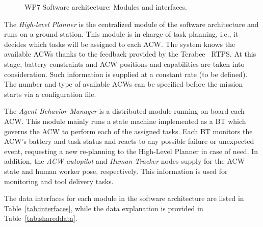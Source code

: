 \begin{figure}[ht]
{}
	\caption{WP7 Software architecture: Modules and interfaces.}
	\label{fig:NodeDiagram}
\end{figure}

The \textit{High-level Planner} is the centralized module of the software architecture and runs on a ground station. This module is in charge of task planning, i.e., it decides which tasks will be assigned to each \gls{ACW}. The system knows the available \glspl{ACW} thanks to the feedback provided by the Terabee~ \gls{RTPS}. At this stage, battery constraints and \gls{ACW} positions and capabilities are taken into consideration. Such information is supplied at a constant rate (to be defined). The number and type of available \glspl{ACW} can be specified before the mission starts via a configuration file. 

The \textit{Agent Behavior Manager} is a distributed module running on board each \gls{ACW}. This module mainly runs a state machine implemented as a \gls{BT} which governs the \gls{ACW} to perform each of the assigned tasks. Each \gls{BT} monitors the \gls{ACW}'s battery and task status and reacts to any possible failure or unexpected event, requesting a new re-planning to the High-Level Planner in case of need. In addition, the \textit{ACW autopilot} and \textit{Human Tracker} nodes supply for the ACW state and human worker pose, respectively. This information is used for monitoring and tool delivery tasks.  

The data interfaces for each module in the software architecture are listed in Table~\ref{tab:interfaces}, while the data explanation is provided in Table~\ref{tab:shareddata}.

